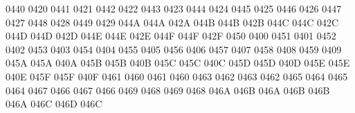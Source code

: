  0440 0420 %
 0441 0421 %
 0442 0422 %
 0443 0423 %
 0444 0424 %
 0445 0425 %
 0446 0426 %
 0447 0427 %
 0448 0428 %
 0449 0429 %
\setcclcucx 044A 044A 042A %
\setcclcucx 044B 044B 042B %
\setcclcucx 044C 044C 042C %
\setcclcucx 044D 044D 042D %
\setcclcucx 044E 044E 042E %
\setcclcucx 044F 044F 042F %
 0450 0400 %
 0451 0401 %
 0452 0402 %
 0453 0403 %
 0454 0404 %
 0455 0405 %
 0456 0406 %
 0457 0407 %
 0458 0408 %
 0459 0409 %
\setcclcucx 045A 045A 040A %
\setcclcucx 045B 045B 040B %
\setcclcucx 045C 045C 040C %
\setcclcucx 045D 045D 040D %
\setcclcucx 045E 045E 040E %
\setcclcucx 045F 045F 040F %
 0461 0460 %
 0461 0460 %
 0463 0462 %
 0463 0462 %
 0465 0464 %
 0465 0464 %
 0467 0466 %
 0467 0466 %
 0469 0468 %
 0469 0468 %
\setcclcucx 046A 046B 046A %
\setcclcucx 046B 046B 046A %
\setcclcucx 046C 046D 046C %

